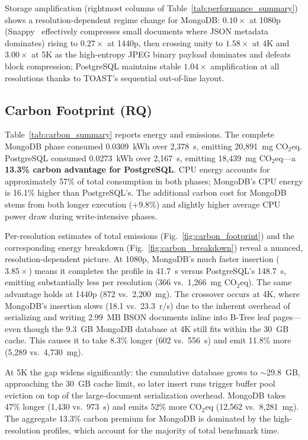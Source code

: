\documentclass[conference]{IEEEtran}
\begin{document}
Storage amplification (rightmost columns of Table~\ref{tab:performance_summary}) shows a resolution-dependent regime change for MongoDB: $0.10\times$ at 1080p (Snappy~\cite{google_snappy} effectively compresses small documents where JSON metadata dominates) rising to $0.27\times$ at 1440p, then crossing unity to $1.58\times$ at 4K and $3.00\times$ at 5K as the high-entropy JPEG binary payload dominates and defeats block compression; PostgreSQL maintains stable $1.04\times$ amplification at all resolutions thanks to TOAST's sequential out-of-line layout.

\subsection{Carbon Footprint (RQ)}
\label{subsec:carbon_footprint}
Table~\ref{tab:carbon_summary} reports energy and emissions. The complete MongoDB phase consumed 0.0309~kWh over 2,378~s, emitting 20,891~mg CO$_2$eq. PostgreSQL consumed 0.0273~kWh over 2,167~s, emitting 18,439~mg CO$_2$eq---a \textbf{13.3\% carbon advantage for PostgreSQL}. CPU energy accounts for approximately 57\% of total consumption in both phases; MongoDB's CPU energy is 16.1\% higher than PostgreSQL's. The additional carbon cost for MongoDB stems from both longer execution (+9.8\%) and slightly higher average CPU power draw during write-intensive phases.

Per-resolution estimates of total emissions (Fig.~\ref{fig:carbon_footprint}) and the corresponding energy breakdown (Fig.~\ref{fig:carbon_breakdown}) reveal a nuanced, resolution-dependent picture. At 1080p, MongoDB's much faster insertion ($3.85\times$) means it completes the profile in 41.7~s versus PostgreSQL's 148.7~s, emitting substantially less per resolution (366 vs.\ 1,266~mg CO$_2$eq). The same advantage holds at 1440p (872 vs.\ 2,200~mg). The crossover occurs at 4K, where MongoDB's insertion slows (18.1 vs.\ 23.3~r/s) due to the inherent overhead of serializing and writing 2.99~MB BSON documents inline into B-Tree leaf pages---even though the 9.3~GB MongoDB database at 4K still fits within the 30~GB cache. This causes it to take 8.3\% longer (602 vs.\ 556~s) and emit 11.8\% more (5,289 vs.\ 4,730~mg).

At 5K the gap widens significantly: the cumulative database grows to $\sim$29.8~GB, approaching the 30~GB cache limit, so later insert runs trigger buffer pool eviction on top of the large-document serialization overhead. MongoDB takes 47\% longer (1,430 vs.\ 973~s) and emits 52\% more CO$_2$eq (12,562 vs.\ 8,281~mg). The aggregate 13.3\% carbon premium for MongoDB is dominated by the high-resolution profiles, which account for the majority of total benchmark time.
\end{document}
